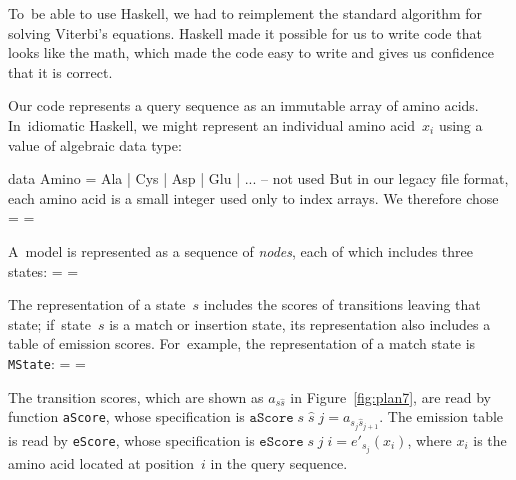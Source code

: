 \documentclass[]{jfp1}
\newcommand\txprobxj[3][]{a#1_{{#2}_{j}{#3}_{j+1}}}  %
\newcommand\figref[1]{Figure~\ref{fig:#1}}
\newif\ifverbatimsmall
\newenvironment{smallverbatim}{\par\small\verbatimsmalltrue\verbatim}{\endverbatim}
\newcommand\smallverbatiminput[1]{%
  \verbatimsmalltrue
  \presvtopsep=\topsep
  \topsep=0.78\topsep
  \verbatimsmallfalse
  \topsep=\presvtopsep
}
\begin{document}
To~be able to use Haskell, we had to reimplement the standard
algorithm for solving Viterbi's equations.
Haskell made it possible for us to write code that looks like the
math,
which made the code easy to write and gives us confidence that it is
correct.

Our code represents a query sequence as an immutable array of amino
acids.
In~idiomatic Haskell, 
we might represent an individual amino acid~$x_i$
using a value of algebraic data type:
\begin{smallverbatim}
data Amino = Ala | Cys | Asp | Glu | ...   -- not used
\end{smallverbatim}
But in our
legacy file format, each amino acid is a small integer
used only to index arrays.
We therefore chose 
\smallverbatiminput{aa}




A~model is represented as a sequence of \emph{nodes}, 
each of which includes three states:\label{code:model3-node}
\smallverbatiminput{model3-node}
The representation of a state~$s$ includes the scores of transitions leaving
that state;
if~state~$s$ is a match or insertion state, its representation also
includes a table of emission scores.
For~example, the representation of a match state is \texttt{MState}:
\smallverbatiminput{model3-mstate}
%
The transition scores, which are shown as $a_{s\hat s}$
in \figref{plan7}, are read by  
function \texttt{aScore}, 
whose
specification is
\mbox{$\mathtt{aScore}\;s\;\hat s\;j = \txprobxj s {\hat s}$}.
The
emission table is read by 
\texttt{eScore}, whose specification
is %
\mbox{$\mathtt{eScore}\;s\;j\;i = e'_{s_j}(x_i)$},
where $x_i$ is the amino acid located at position~$i$ in the query
sequence. 
%

\end{document}

